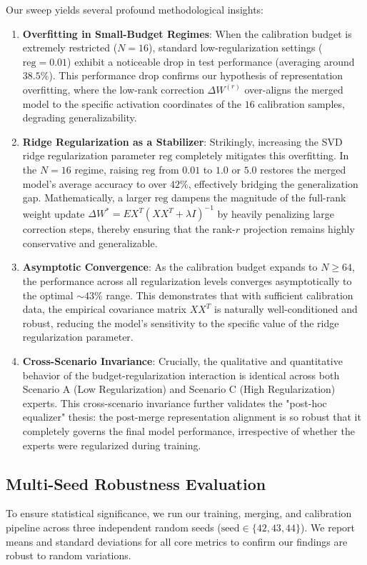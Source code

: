 \documentclass{article}
\theoremstyle{plain}
\theoremstyle{definition}
\theoremstyle{remark}
\begin{document}
Our sweep yields several profound methodological insights:
\begin{enumerate}\itemsep=0pt \parsep=0pt \topsep=0pt
    \item \textbf{Overfitting in Small-Budget Regimes}: When the calibration budget is extremely restricted ($N=16$), standard low-regularization settings ($\text{reg}=0.01$) exhibit a noticeable drop in test performance (averaging around $38.5\%$). This performance drop confirms our hypothesis of representation overfitting, where the low-rank correction $\Delta W^{(r)}$ over-aligns the merged model to the specific activation coordinates of the $16$ calibration samples, degrading generalizability.
    \item \textbf{Ridge Regularization as a Stabilizer}: Strikingly, increasing the SVD ridge regularization parameter $\text{reg}$ completely mitigates this overfitting. In the $N=16$ regime, raising $\text{reg}$ from $0.01$ to $1.0$ or $5.0$ restores the merged model's average accuracy to over $42\%$, effectively bridging the generalization gap. Mathematically, a larger $\text{reg}$ dampens the magnitude of the full-rank weight update $\Delta W^* = E X^T (X X^T + \lambda I)^{-1}$ by heavily penalizing large correction steps, thereby ensuring that the rank-$r$ projection remains highly conservative and generalizable.
    \item \textbf{Asymptotic Convergence}: As the calibration budget expands to $N \ge 64$, the performance across all regularization levels converges asymptotically to the optimal $\sim 43\%$ range. This demonstrates that with sufficient calibration data, the empirical covariance matrix $X X^T$ is naturally well-conditioned and robust, reducing the model's sensitivity to the specific value of the ridge regularization parameter.
    \item \textbf{Cross-Scenario Invariance}: Crucially, the qualitative and quantitative behavior of the budget-regularization interaction is identical across both Scenario A (Low Regularization) and Scenario C (High Regularization) experts. This cross-scenario invariance further validates the "post-hoc equalizer" thesis: the post-merge representation alignment is so robust that it completely governs the final model performance, irrespective of whether the experts were regularized during training.
\end{enumerate}

\subsection{Multi-Seed Robustness Evaluation}
To ensure statistical significance, we run our training, merging, and calibration pipeline across three independent random seeds ($\text{seed} \in \{42, 43, 44\}$). We report means and standard deviations for all core metrics to confirm our findings are robust to random variations.
\end{document}
